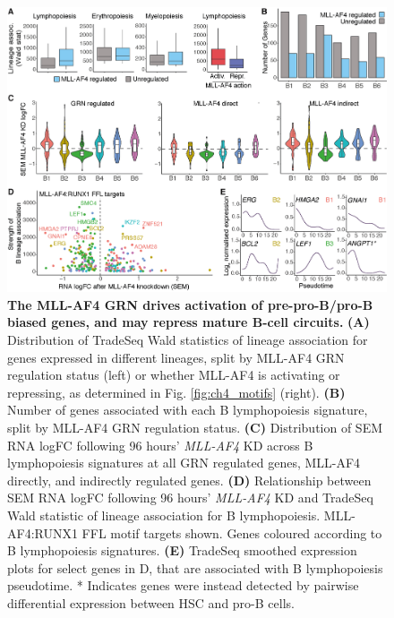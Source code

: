 \begin{figure}[!t]
    \centering
    \includegraphics[width=\textwidth,height=\textheight,keepaspectratio]{figures/chapter4/ch4_multiome-grn.png}
    \caption[{The MLL-AF4 GRN drives activation of pre-pro-B/pro-B biased genes, and may repress mature B-cell circuits.}]
    {\textbf{The MLL-AF4 GRN drives activation of pre-pro-B/pro-B biased genes, and may repress mature B-cell circuits.} 
    \textbf{(A)} Distribution of TradeSeq Wald statistics of lineage association for genes expressed in different lineages, split by MLL-AF4 GRN regulation status (left) or whether MLL-AF4 is activating or repressing, as determined in Fig. \ref{fig:ch4_motifs} (right).
    \textbf{(B)} Number of genes associated with each B lymphopoiesis signature, split by MLL-AF4 GRN regulation status.
    \textbf{(C)} Distribution of SEM RNA logFC following 96 hours' \textit{MLL-AF4} KD across B lymphopoiesis signatures at all GRN regulated genes, MLL-AF4 directly, and indirectly regulated genes. 
    \textbf{(D)} Relationship between SEM RNA logFC following 96 hours' \textit{MLL-AF4} KD and TradeSeq Wald statistic of lineage association for B lymphopoiesis. MLL-AF4:RUNX1 FFL motif targets shown. Genes coloured according to B lymphopoiesis signatures.
    \textbf{(E)} TradeSeq smoothed expression plots for select genes in D, that are associated with B lymphopoiesis pseudotime. * Indicates genes were instead detected by pairwise differential expression between HSC and pro-B cells.
    }
    \label{fig:ch4_multiome-grn}
\end{figure}

